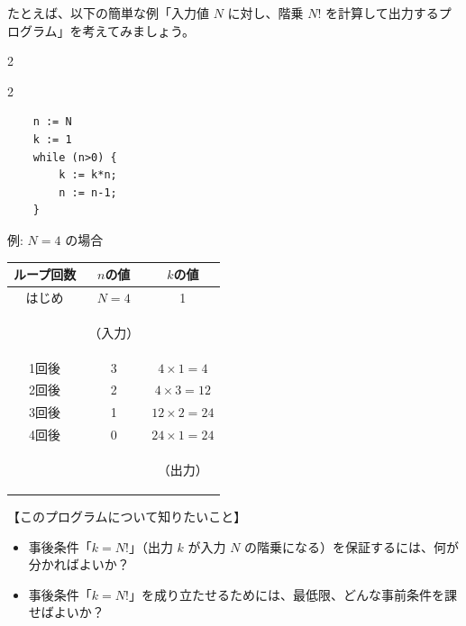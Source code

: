 \documentclass[
		head_space=20mm,
		foot_space=20mm,
		gutter=10mm,
		line_length=190mm
]{jlreq}
\begin{document}
たとえば、以下の簡単な例「入力値 $N$ に対し、階乗 $N!$ を計算して出力するプログラム」を考えてみましょう。

\begin{multicols}{2}
\begin{multicols}{2} %
\begin{framed}
	\begin{verbatim}
	n := N
	k := 1
	while (n>0) {
		k := k*n;
		n := n-1;
	}\end{verbatim}
\end{framed}
%
	\noindent \hspace*{-18pt}
	\small 例: $N=4$ の場合\vspace{6pt}\\%
	\hspace*{-20pt}
	\begin{small}
	\begin{tabular}{c|c|c}
		\hline
		\!\!ループ回数\!\! & $n$の値 & $k$の値\\\hline\hline
		はじめ & \!$N=4$\! & 1 \\[-4pt]
		& \begin{tiny}（入力）\end{tiny} & \\ \hline
		1回後 & 3 & $4\times 1=4$ \\\hline
		2回後 & 2 & $4\times 3=12$ \\\hline
		3回後 & 1 & $12\times 2 = 24$ \\\hline
		4回後 & 0 & $24\times 1 = 24$ \\[-4pt]
		&& \begin{tiny}（出力）\end{tiny} \\\hline
	\end{tabular}
	\end{small}
\end{multicols} %
%
\begin{framed}
\noindent 【このプログラムについて知りたいこと】
\begin{itemize}
	\item 事後条件「$k=N!$」（出力 $k$ が入力 $N$ の階乗になる）を保証するには、何が分かればよいか？
	\item 事後条件「$k=N!$」を成り立たせるためには、最低限、どんな事前条件を課せばよいか？
\end{itemize}
\end{framed}
\end{multicols}
\end{document}
